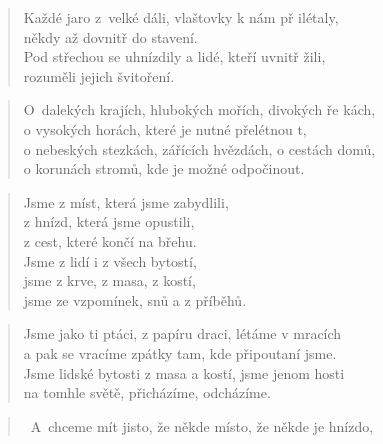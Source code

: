 \begin{song}{}
\begin{deco}
	    
\end{deco}
\begin{verse}
   Každé jaro z~velké dáli, vlaštovky k nám př ilétaly, \\ 
	někdy až dovnitř do stavení.  \\
	Pod střechou se uhnízdily a lidé, kteří uvnitř žili, \\ rozuměli jejich švitoření.
\end{verse}
\begin{verse}
   O~dalekých krajích, hlubokých mořích, divokých ře kách, \\
   o vysokých horách, které je nutné přelétnou t, \\
   o nebeských stezkách, zářících hvězdách, o cestách domů, \\
   o korunách stromů, kde je možné odpočinout.
\end{verse}
\begin{deco}
	    
\end{deco}
\begin{verse}
   Jsme z míst, která jsme zabydlili, \\
   z hnízd, která jsme opustili, \\
   z cest, které končí na břehu. \\
   Jsme z lidí i z všech bytostí, \\
   jsme z krve, z masa, z kostí, \\
   jsme ze vzpomínek, snů a z příběhů.
\end{verse}
\begin{verse}
   Jsme jako ti ptáci, z papíru draci, létáme v mracích \\
   a pak se vracíme zpátky tam, kde připoutaní jsme. \\
   Jsme lidské bytosti z masa a kostí, jsme jenom hosti \\
   na tomhle světě, přicházíme, odcházíme.
\end{verse}
\begin{verse}
  ~A~chceme mít jisto, že někde místo, že někde je hnízdo, \\

\end{verse}
\end{song}
